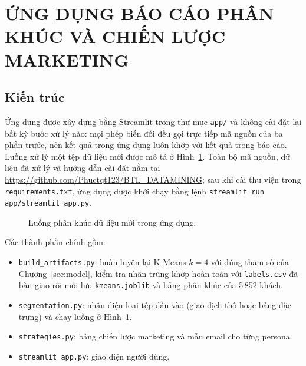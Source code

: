 \documentclass[../report.tex]{subfiles}
\begin{document}
\newpage
\section{ỨNG DỤNG BÁO CÁO PHÂN KHÚC VÀ CHIẾN LƯỢC MARKETING}
\label{sec:app}

\subsection{Kiến trúc}

Ứng dụng được xây dựng bằng Streamlit trong thư mục \texttt{app/} và không cài đặt lại bất kỳ bước xử lý nào: mọi phép biến đổi đều gọi trực tiếp mã nguồn của ba phần trước, nên kết quả trong ứng dụng luôn khớp với kết quả trong báo cáo. Luồng xử lý một tệp dữ liệu mới được mô tả ở Hình~\ref{fig:app_flow}. Toàn bộ mã nguồn, dữ liệu đã xử lý và hướng dẫn cài đặt nằm tại \url{https://github.com/Phuctqt123/BTL_DATAMINING}; sau khi cài thư viện trong \texttt{requirements.txt}, ứng dụng được khởi chạy bằng lệnh \texttt{streamlit run app/streamlit\_app.py}.

\begin{figure}[H]
\centering
{}
\caption{Luồng phân khúc dữ liệu mới trong ứng dụng.}
\label{fig:app_flow}
\end{figure}

Các thành phần chính gồm:
\begin{itemize}[leftmargin=1.5em]
\item \texttt{build\_artifacts.py}: huấn luyện lại K-Means $k=4$ với đúng tham số của Chương~\ref{sec:model}, kiểm tra nhãn trùng khớp hoàn toàn với \texttt{labels.csv} đã bàn giao rồi mới lưu \texttt{kmeans.joblib} và bảng phân khúc của 5\,852 khách.
\item \texttt{segmentation.py}: nhận diện loại tệp đầu vào (giao dịch thô hoặc bảng đặc trưng) và chạy luồng ở Hình~\ref{fig:app_flow}.
\item \texttt{strategies.py}: bảng chiến lược marketing và mẫu email cho từng persona.
\item \texttt{streamlit\_app.py}: giao diện người dùng.
\end{itemize}
\end{document}
